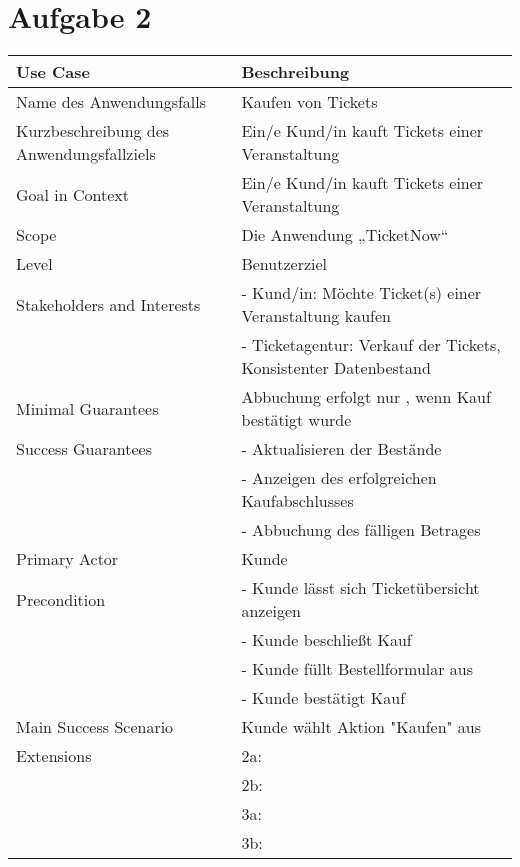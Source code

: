 \chapter*{Aufgabe 2}

\begin{tabular}{p{} p{}} 
	\hline
	Use Case & Beschreibung \\ 
	\hline
	Name des Anwendungsfalls & Kaufen von Tickets \\
	\hline
	Kurzbeschreibung des Anwendungsfallziels & Ein/e Kund/in kauft Tickets einer Veranstaltung \\
	\hline 
	Goal in Context & Ein/e Kund/in kauft Tickets einer Veranstaltung \\
	\hline
	Scope & Die Anwendung „TicketNow“ \\
	\hline
	Level & Benutzerziel \\
	\hline
	Stakeholders and Interests & - Kund/in: Möchte Ticket(s) einer Veranstaltung kaufen \\
	                             & - Ticketagentur: Verkauf der Tickets, Konsistenter Datenbestand \\
	\hline
	Minimal Guarantees & Abbuchung erfolgt nur , wenn Kauf bestätigt wurde \\
	\hline
	Success Guarantees & - Aktualisieren der Bestände\\
	                   & - Anzeigen des erfolgreichen Kaufabschlusses \\
	                   & - Abbuchung des fälligen Betrages \\
	\hline
	Primary Actor & Kunde \\
	\hline
	Precondition & - Kunde lässt sich Ticketübersicht anzeigen \\
	             & - Kunde beschließt Kauf \\
	             & - Kunde füllt Bestellformular aus \\ 
	             & - Kunde bestätigt Kauf \\
	             \hline
	Main Success Scenario &  Kunde wählt Aktion "Kaufen" aus \\
	\hline
	Extensions & 2a: \\
	           & 2b: \\
	           & 3a: \\
	           & 3b: \\
	\hline           
\end{tabular} 